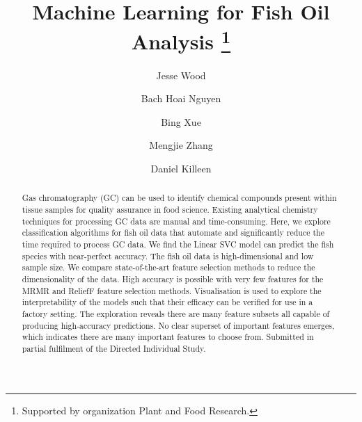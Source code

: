 \documentclass[runningheads]{llncs}
\begin{document}
%
\title{Machine Learning for Fish Oil Analysis \thanks{Supported by organization Plant and Food Research.}}
%
%
\author{Jesse Wood \and
Bach Hoai Nguyen \and
Bing Xue \and 
Mengjie Zhang \and 
Daniel Killeen
} 
%
%

%
\maketitle              %
%
\begin{abstract}

Gas chromatography (GC) can be used to identify chemical compounds present within tissue samples for quality assurance in food science.
Existing analytical chemistry techniques for processing GC data are manual and time-consuming.
Here, we explore classification algorithms for fish oil data that automate and significantly reduce the time required to process GC data.
We find the Linear SVC model can predict the fish species with near-perfect accuracy.
The fish oil data is high-dimensional and low sample size.
We compare state-of-the-art feature selection methods to reduce the dimensionality of the data.
High accuracy is possible with very few features for the MRMR and ReliefF feature selection methods.
Visualisation is used to explore the interpretability of the models such that their efficacy can be verified for use in a factory setting.
The exploration reveals there are many feature subsets all capable of producing high-accuracy predictions.
No clear superset of important features emerges, which indicates there are many important features to choose from.
Submitted in partial fulfilment of the Directed Individual Study.

\end{abstract}
%
%
%
\end{document}
